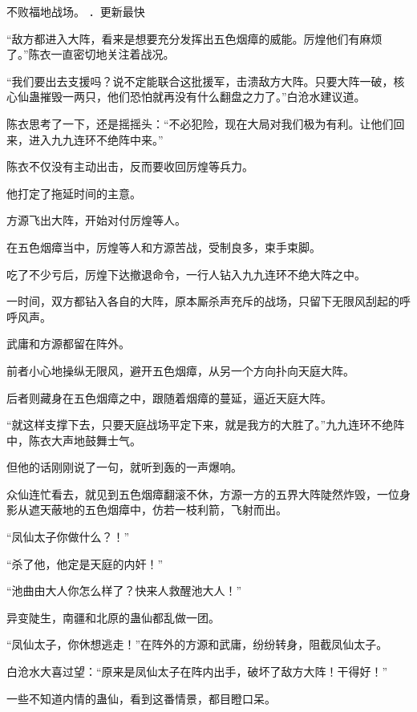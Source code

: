 
\begin{this_body}



不败福地战场。 ．更新最快

“敌方都进入大阵，看来是想要充分发挥出五色烟瘴的威能。厉煌他们有麻烦了。”陈衣一直密切地关注着战况。

“我们要出去支援吗？说不定能联合这批援军，击溃敌方大阵。只要大阵一破，核心仙蛊摧毁一两只，他们恐怕就再没有什么翻盘之力了。”白沧水建议道。

陈衣思考了一下，还是摇摇头：“不必犯险，现在大局对我们极为有利。让他们回来，进入九九连环不绝阵中来。”

陈衣不仅没有主动出击，反而要收回厉煌等兵力。

他打定了拖延时间的主意。

方源飞出大阵，开始对付厉煌等人。

在五色烟瘴当中，厉煌等人和方源苦战，受制良多，束手束脚。

吃了不少亏后，厉煌下达撤退命令，一行人钻入九九连环不绝大阵之中。

一时间，双方都钻入各自的大阵，原本厮杀声充斥的战场，只留下无限风刮起的呼呼风声。

武庸和方源都留在阵外。

前者小心地操纵无限风，避开五色烟瘴，从另一个方向扑向天庭大阵。

后者则藏身在五色烟瘴之中，跟随着烟瘴的蔓延，逼近天庭大阵。

“就这样支撑下去，只要天庭战场平定下来，就是我方的大胜了。”九九连环不绝阵中，陈衣大声地鼓舞士气。

但他的话刚刚说了一句，就听到轰的一声爆响。

众仙连忙看去，就见到五色烟瘴翻滚不休，方源一方的五界大阵陡然炸毁，一位身影从遮天蔽地的五色烟瘴中，仿若一枝利箭，飞射而出。

“凤仙太子你做什么？！”

“杀了他，他定是天庭的内奸！”

“池曲由大人你怎么样了？快来人救醒池大人！”

异变陡生，南疆和北原的蛊仙都乱做一团。

“凤仙太子，你休想逃走！”在阵外的方源和武庸，纷纷转身，阻截凤仙太子。

白沧水大喜过望：“原来是凤仙太子在阵内出手，破坏了敌方大阵！干得好！”

一些不知道内情的蛊仙，看到这番情景，都目瞪口呆。


\end{this_body}
